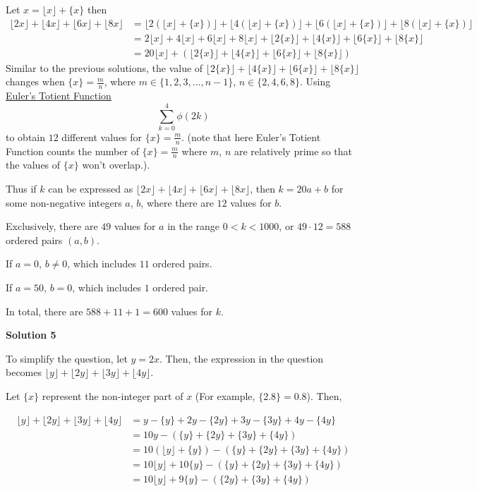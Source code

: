 \begin{enumerate}
Let $x=\lfloor x\rfloor+\{x\}$ then
 \begin{align*} \lfloor 2x\rfloor+\lfloor 4x\rfloor+\lfloor 6x\rfloor+\lfloor 8x\rfloor&=\lfloor 2(\lfloor x\rfloor+\{x\})\rfloor+\lfloor 4(\lfloor x\rfloor+\{x\})\rfloor+\lfloor 6(\lfloor x\rfloor+\{x\})\rfloor+\lfloor 8(\lfloor x\rfloor+\{x\})\rfloor\\ &=2\lfloor x\rfloor+4\lfloor x\rfloor+6\lfloor x\rfloor+8\lfloor x\rfloor+\lfloor 2\{x\}\rfloor+\lfloor 4\{x\}\rfloor+\lfloor 6\{x\}\rfloor+\lfloor 8\{x\}\rfloor\\ &=20\lfloor x\rfloor+(\lfloor 2\{x\}\rfloor+\lfloor 4\{x\}\rfloor+\lfloor 6\{x\}\rfloor+\lfloor 8\{x\}\rfloor) \end{align*}
Similar to the previous solutions, the value of $\lfloor 2\{x\}\rfloor+\lfloor 4\{x\}\rfloor+\lfloor 6\{x\}\rfloor+\lfloor 8\{x\}\rfloor$ changes when $\{x\}=\frac{m}{n}$, where $m\in\{1,2,3,...,n-1\}$, $n\in\{2,4,6,8\}$. Using \href{https://artofproblemsolving.com/wiki/index.php?title=Euler\%27s\_Totient\_Function}{Euler's Totient Function}
 \[\sum\limits_{k=0}^4 \phi(2k)\]to obtain $12$ different values for $\{x\}=\frac{m}{n}$. (note that here Euler's Totient Function counts the number of $\{x\}=\frac{m}{n}$ where $m$, $n$ are relatively prime so that the values of $\{x\}$ won't overlap.). 

 Thus if $k$ can be expressed as $\lfloor 2x\rfloor+\lfloor 4x\rfloor+\lfloor 6x\rfloor+\lfloor 8x\rfloor$, then $k=20a+b$ for some non-negative integers $a$, $b$, where there are $12$ values for $b$. 

 Exclusively, there are $49$ values for $a$ in the range $0<k<1000$, or $49\cdot12=588$ ordered pairs $(a,b)$.

 If $a=0$, $b\neq0$, which includes $11$ ordered pairs.

 If $a=50$, $b=0$, which includes $1$ ordered pair.

 In total, there are $588+11+1=\boxed{600}$ values for $k$.

 



\textbf{Solution 5}

To simplify the question, let $y = 2x$. Then, the expression in the question becomes $\lfloor y \rfloor + \lfloor 2y \rfloor + \lfloor 3y \rfloor + \lfloor 4y \rfloor$. 

 Let $\{x\}$ represent the non-integer part of $x$ (For example, $\{2.8\} = 0.8$). Then, 

 
 \begin{align*} \lfloor y \rfloor + \lfloor 2y \rfloor + \lfloor 3y \rfloor + \lfloor 4y \rfloor &= y - \{y\} + 2y - \{2y\} + 3y - \{3y\} + 4y - \{4y\} \\ &= 10y - (\{y\} + \{2y\} + \{3y\} + \{4y\}) \\ &= 10(\lfloor y \rfloor + \{y\}) - (\{y\} + \{2y\} + \{3y\} + \{4y\}) \\ &= 10\lfloor y \rfloor + 10\{y\} - (\{y\} + \{2y\} + \{3y\} + \{4y\}) \\ &= 10\lfloor y \rfloor + 9\{y\} - (\{2y\} + \{3y\} + \{4y\}) \\ \end{align*}



\end{enumerate}
